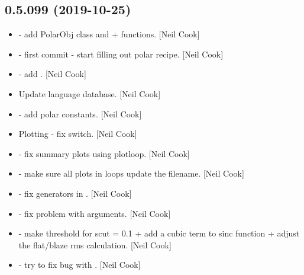 \documentclass[a4paper,10pt,english]{report}
\begin{document}
\subsection{0.5.099 (2019-10-25)}
\label{\detokenize{misc/changelog:id43}}\begin{itemize}
\item {} 
 - add PolarObj class and 
+  functions. {[}Neil Cook{]}

\item {} 
 - first commit - start filling out
polar recipe. {[}Neil Cook{]}

\item {} 
 - add .
{[}Neil Cook{]}

\item {} 
Update language database. {[}Neil Cook{]}

\item {} 
 - add polar constants. {[}Neil
Cook{]}

\item {} 
Plotting - fix  switch. {[}Neil Cook{]}

\item {} 
 - fix summary plots using plotloop. {[}Neil Cook{]}

\item {} 
 - make sure all plots in loops update the
filename. {[}Neil Cook{]}

\item {} 
 - fix generators in
. {[}Neil Cook{]}

\item {} 
 - fix problem with  arguments. {[}Neil
Cook{]}

\item {} 
 - make threshold for scut = 0.1 + add a cubic term to sinc
function + adjust the flat/blaze rms calculation. {[}Neil Cook{]}

\item {} 
 - try to fix bug with . {[}Neil
Cook{]}


\end{itemize}
\end{document}
